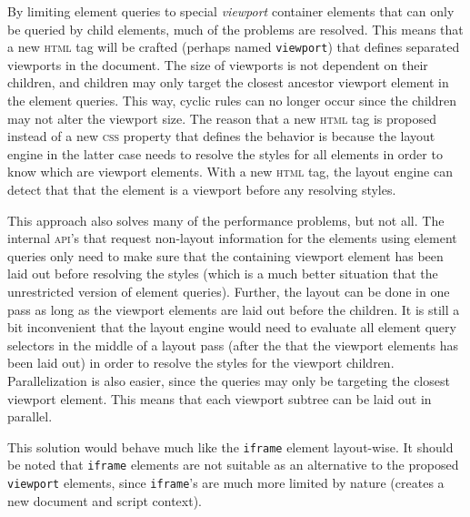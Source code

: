 \documentclass[a4paper,11pt]{kth-mag}
\newcommand{\code}[1]{\texttt{#1}}
\begin{document}
          By limiting element queries to special \emph{viewport} container elements that can only be queried by child elements, much of the problems are resolved.
          This means that a new \textsc{html} tag will be crafted (perhaps named \code{viewport}) that defines separated viewports in the document.
          The size of viewports is not dependent on their children, and children may only target the closest ancestor viewport element in the element queries.
          This way, cyclic rules can no longer occur since the children may not alter the viewport size.
          The reason that a new \textsc{html} tag is proposed instead of a new \textsc{css} property that defines the behavior is because the layout engine in the latter case needs to resolve the styles for all elements in order to know which are viewport elements.
          With a new \textsc{html} tag, the layout engine can detect that that the element is a viewport before any resolving styles.

          This approach also solves many of the performance problems, but not all.
          The internal \textsc{api}'s that request non-layout information for the elements using element queries only need to make sure that the containing viewport element has been laid out before resolving the styles (which is a much better situation that the unrestricted version of element queries).
          Further, the layout can be done in one pass as long as the viewport elements are laid out before the children.
          It is still a bit inconvenient that the layout engine would need to evaluate all element query selectors in the middle of a layout pass (after the that the viewport elements has been laid out) in order to resolve the styles for the viewport children.
          Parallelization is also easier, since the queries may only be targeting the closest viewport element.
          This means that each viewport subtree can be laid out in parallel.

          This solution would behave much like the \code{iframe} element layout-wise.
          It should be noted that \code{iframe} elements are not suitable as an alternative to the proposed \code{viewport} elements, since \code{iframe}'s are much more limited by nature (creates a new document and script context).
\end{document}
